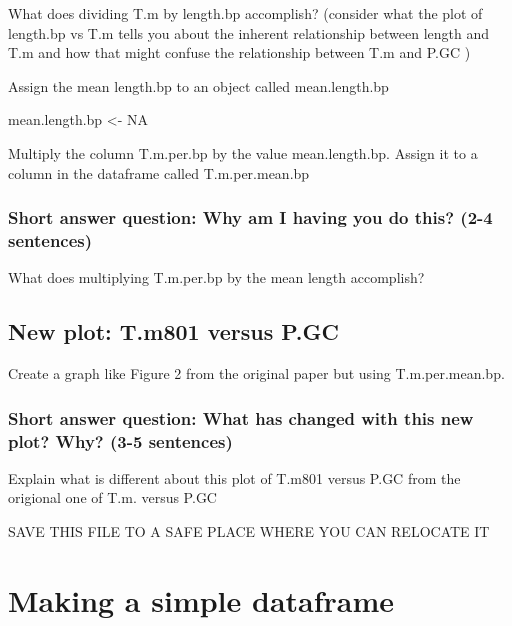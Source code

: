 \documentclass[
]{book}
\newenvironment{Shaded}{\begin{snugshade}}{\end{snugshade}}
\newcommand{\ConstantTok}[1]{\textcolor[rgb]{0.00,0.00,0.00}{#1}}
\newcommand{\NormalTok}[1]{#1}
\newcommand{\OtherTok}[1]{\textcolor[rgb]{0.56,0.35,0.01}{#1}}
\begin{document}
What does dividing T.m by length.bp accomplish? (consider what the plot of length.bp vs T.m tells you about the inherent relationship between length and T.m and how that might confuse the relationship between T.m and P.GC )

Assign the mean length.bp to an object called mean.length.bp

\begin{Shaded}
\begin{Highlighting}[]
\NormalTok{mean.length.bp }\OtherTok{\textless{}{-}} \ConstantTok{NA}
\end{Highlighting}
\end{Shaded}

Multiply the column T.m.per.bp by the value mean.length.bp. Assign it to a column in the dataframe called T.m.per.mean.bp

\hypertarget{short-answer-question-why-am-i-having-you-do-this-2-4-sentences-1}{%
\subsection{Short answer question: Why am I having you do this? (2-4 sentences)}\label{short-answer-question-why-am-i-having-you-do-this-2-4-sentences-1}}

What does multiplying T.m.per.bp by the mean length accomplish?

\hypertarget{new-plot-t.m801-versus-p.gc-1}{%
\section{New plot: T.m801 versus P.GC}\label{new-plot-t.m801-versus-p.gc-1}}

Create a graph like Figure 2 from the original paper but using T.m.per.mean.bp.

\hypertarget{short-answer-question-what-has-changed-with-this-new-plot-why-3-5-sentences-1}{%
\subsection{Short answer question: What has changed with this new plot? Why? (3-5 sentences)}\label{short-answer-question-what-has-changed-with-this-new-plot-why-3-5-sentences-1}}

Explain what is different about this plot of T.m801 versus P.GC from the origional one of T.m. versus P.GC

SAVE THIS FILE TO A SAFE PLACE WHERE YOU CAN RELOCATE IT

\hypertarget{making-a-simple-dataframe}{%
\chapter{Making a simple dataframe}\label{making-a-simple-dataframe}}
\end{document}
